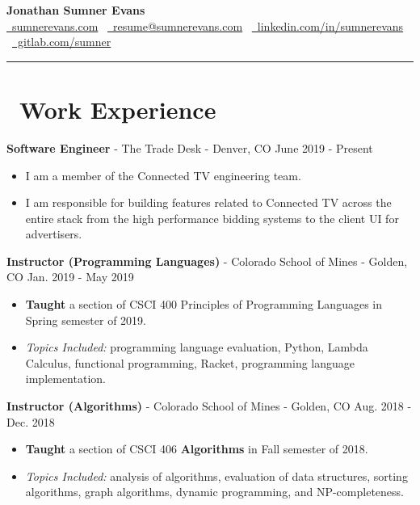\documentclass[10pt,letterpaper]{article}
\begin{document}
\begin{center}
    {\huge\textbf{Jonathan Sumner Evans}} \\
    \vspace{3pt}
    \href{https://sumnerevans.com}{\faGlobe\ sumnerevans.com}
    \textbar\ \href{mailto:resume@sumnerevans.com}{\faEnvelope\ resume@sumnerevans.com}
    \textbar\ \href{https://www.linkedin.com/in/sumnerevans}{\faLinkedin\ linkedin.com/in/sumnerevans}
    \textbar\ \href{https://gitlab.com/sumner}{\faGitlab\ gitlab.com/sumner}
    \rule{\textwidth}{0.5pt}
\end{center}

\section*{\faBriefcase\ Work Experience}
\textbf{Software Engineer} - The Trade Desk - Denver, CO
\hfill June 2019 - Present
\begin{itemize}
    \item I am a member of the Connected TV engineering team.
    \item I am responsible for building features related to Connected TV across
        the entire stack from the high performance bidding systems to the client
        UI for advertisers.
\end{itemize}

\textbf{Instructor (Programming Languages)} - Colorado School of Mines - Golden, CO
\hfill Jan. 2019 - May 2019
\begin{itemize}
    \item \textbf{Taught} a section of CSCI 400 Principles of Programming
        Languages in Spring semester of 2019.
    \item \textit{Topics Included:} programming language evaluation, Python,
        Lambda Calculus, functional programming, Racket, programming language
        implementation.
\end{itemize}

\textbf{Instructor (Algorithms)} - Colorado School of Mines - Golden, CO
\hfill Aug. 2018 - Dec. 2018
\begin{itemize}
    \item \textbf{Taught} a section of CSCI 406 \textbf{Algorithms} in Fall
        semester of 2018.
    \item \textit{Topics Included:} analysis of algorithms, evaluation of data
        structures, sorting algorithms, graph algorithms, dynamic programming,
        and NP-completeness.
\end{itemize}
\end{document}
